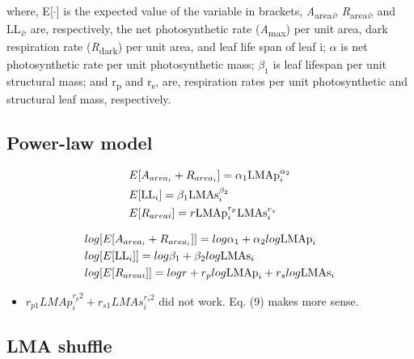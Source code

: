 \documentclass[12pt,]{article}
\providecommand{\tightlist}{%
  \setlength{\itemsep}{0pt}\setlength{\parskip}{0pt}}
\begin{document}
where, E{[}\(\cdot\){]} is the expected value of the variable in
brackets, \emph{A}\textsubscript{area\emph{i}},
\emph{R}\textsubscript{area\emph{i}}, and LL\textsubscript{\emph{i}},
are, respectively, the net photosynthetic rate
(\emph{A}\textsubscript{max}) per unit area, dark respiration rate
(\emph{R}\textsubscript{dark}) per unit area, and leaf life span of leaf
i; \(\alpha\) is net photosynthetic rate per unit photosynthetic mass;
\(\beta_1\) is leaf lifespan per unit structural mass; and
r\textsubscript{p} and r\textsubscript{s}, are, respiration rates per
unit photosynthetic and structural leaf mass, respectively.

\subsection{Power-law model}\label{power-law-model}

\begin{align}
  &E[A_{area_i} + R_{area_i}]
  = \alpha_1{\rm LMAp}_{i}^{\alpha_2} \label{eq:E-AR2}\\
  &E[{\rm LL}_{i}] = \beta_{1} {\rm LMAs}_{i}^{\beta_2} \label{eq:E-LL2}\\
  &E[R_{areai}] = r{\rm LMAp}_{i}^{r_p}{\rm LMAs}_{i}^{r_s} \label{eq:E-R2}
\end{align}

\begin{align}
  &log[E[A_{area_i} + R_{area_i}]]
  = log\alpha_1 + {\alpha_2}log{\rm LMAp}_{i}\label{eq:E-AR3}\\
  &log[E[{\rm LL}_{i}]] =  log\beta_1 + {\beta_2}log{\rm LMAs}_{i} \label{eq:E-LL3}\\
  &log[E[R_{areai}]] =  logr + r_p log{\rm LMAp}_i + r_s log{\rm LMAs}_i \label{eq:E-R3}
\end{align}

\begin{itemize}
\tightlist
\item
  \(r_{p1} LMAp_{i}^{r_p2} + r_{s1} LMAs_{i}^{r_s2}\) did not work. Eq.
  (9) makes more sense.
\end{itemize}

\subsection{LMA shuffle}\label{lma-shuffle}
\end{document}
